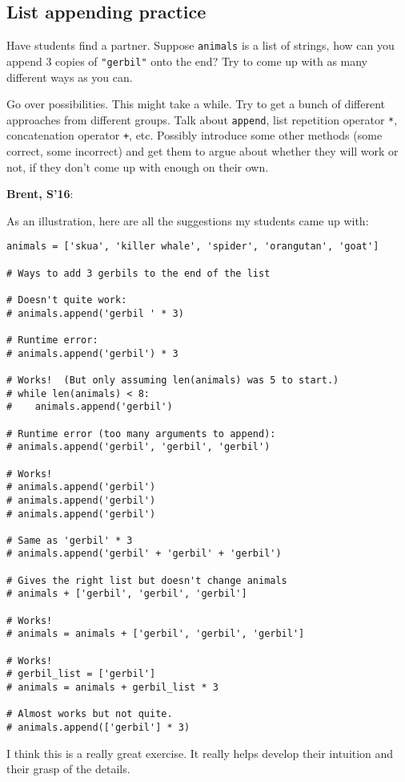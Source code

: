 \documentclass{article}
\newenvironment{reflect}[1]
{
  \noindent
  \begin{lrbox}{\reflectbox}
    \begin{minipage}[t]{\textwidth}
      \textbf{#1}:
}{
    \end{minipage}
  \end{lrbox}
  \fbox{\usebox{\reflectbox}}
}
\begin{document}
\subsection*{List appending practice}

Have students find a partner. Suppose \verb|animals| is a list of
strings, how can you append 3 copies of \verb|"gerbil"| onto the end?
Try to come up with as many different ways as you can.

Go over possibilities.  This might take a while.  Try to get a bunch
of different approaches from different groups.  Talk about
\verb|append|, list repetition operator \verb|*|, concatenation
operator \verb|+|, etc.  Possibly introduce some other methods (some
correct, some incorrect) and get them to argue about whether they will
work or not, if they don't come up with enough on their own.

\begin{reflect}{Brent, S'16}
  As an illustration, here are all the suggestions my students came up
  with:
\begin{verbatim}
animals = ['skua', 'killer whale', 'spider', 'orangutan', 'goat']

# Ways to add 3 gerbils to the end of the list

# Doesn't quite work:
# animals.append('gerbil ' * 3)

# Runtime error:
# animals.append('gerbil') * 3

# Works!  (But only assuming len(animals) was 5 to start.)
# while len(animals) < 8:
#    animals.append('gerbil')

# Runtime error (too many arguments to append):
# animals.append('gerbil', 'gerbil', 'gerbil')

# Works!
# animals.append('gerbil')
# animals.append('gerbil')
# animals.append('gerbil')

# Same as 'gerbil' * 3
# animals.append('gerbil' + 'gerbil' + 'gerbil')

# Gives the right list but doesn't change animals
# animals + ['gerbil', 'gerbil', 'gerbil']

# Works!
# animals = animals + ['gerbil', 'gerbil', 'gerbil']

# Works!
# gerbil_list = ['gerbil']
# animals = animals + gerbil_list * 3

# Almost works but not quite.
# animals.append(['gerbil'] * 3)
\end{verbatim}

  I think this is a really great exercise. It really helps develop
  their intuition and their grasp of the details.
\end{reflect}
\end{document}
